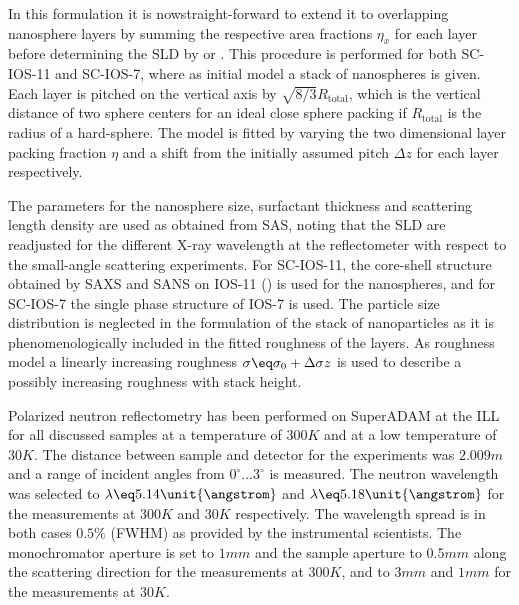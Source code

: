 \documentclass[\main/dresen_thesis.tex]{subfiles}
\begin{document}
    In this formulation it is nowstraight-forward to extend it to overlapping nanosphere layers by summing the respective area fractions $\eta_x$ for each layer before determining the SLD by  or .
    This procedure is performed for both SC-IOS-11 and SC-IOS-7, where as initial model a stack of nanospheres is given.
    Each layer is pitched on the vertical axis by $\sqrt{8/3} R_\mathrm{total}$, which is the vertical distance of two sphere centers for an ideal close sphere packing if $R_\mathrm{total}$ is the radius of a hard-sphere.
    The model is fitted by varying the two dimensional layer packing fraction $\eta$ and a shift from the initially assumed pitch $\Delta z$ for each layer respectively.

    The parameters for the nanosphere size, surfactant thickness and scattering length density are used as obtained from SAS, noting that the SLD are readjusted for the different X-ray wavelength at the reflectometer with respect
    to the small-angle scattering experiments.
    For SC-IOS-11, the core-shell structure obtained by SAXS and SANS on IOS-11 () is used for the nanospheres, and for SC-IOS-7 the single phase structure of IOS-7 is used.
    The particle size distribution is neglected in the formulation of the stack of nanoparticles as it is phenomenologically included in the fitted roughness of the layers.
    As roughness model a linearly increasing roughness $\sigma \eq \sigma_0 + \Delta \sigma z$ is used to describe a possibly increasing roughness with stack height.

    Polarized neutron reflectometry has been performed on SuperADAM at the ILL for all discussed samples at a temperature of $300 \unit{K}$ and at a low temperature of $30 \unit{K}$.
    The distance between sample and detector for the experiments was $2.009 \unit{m}$ and a range of incident angles from $0 ^\circ \ldots 3 ^\circ$ is measured.
    The neutron wavelength was selected to $\lambda \eq 5.14 \unit{\angstrom}$ and $\lambda \eq 5.18 \unit{\angstrom}$ for the measurements at $300 \unit{K}$ and $30 \unit{K}$ respectively.
    The wavelength spread is in both cases $0.5 \%$ (FWHM) as provided by the instrumental scientists.
    The monochromator aperture is set to $1 \unit{mm}$ and the sample aperture to $0.5 \unit{mm}$ along the scattering direction for the measurements at $300 \unit{K}$, and to $3 \unit{mm}$ and $1 \unit{mm}$ for the measurements at $30 \unit{K}$.
\end{document}
